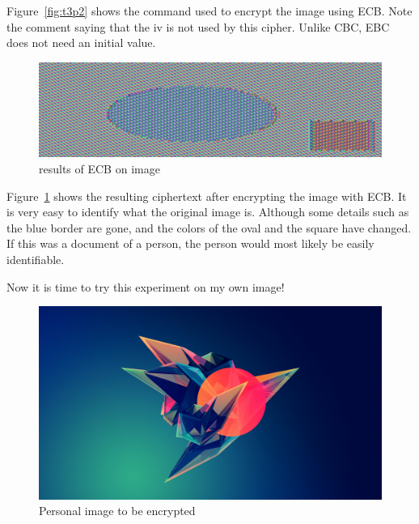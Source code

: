 \documentclass[12pt]{article}
\begin{document}
Figure~\ref{fig:t3p2} shows the command used to encrypt the image using ECB. Note the comment
saying that the iv is not used by this cipher. Unlike CBC, EBC does not need an initial value. 

\begin{figure}[H]
    \begin{center}
        \includegraphics[scale=0.35]{t3p3.png}
    \end{center}{}
    \caption{results of ECB on image}
    \label{fig:t3p3}
\end{figure}

Figure~\ref{fig:t3p3} shows the resulting ciphertext after encrypting the image with ECB. It is
very easy to identify what the original image is. Although some details such as the blue border
are gone, and the colors of the oval and the square have changed. If this was a document of a
person, the person would most likely be easily identifiable.

Now it is time to try this experiment on my own image!

\begin{figure}[H]
    \begin{center}
        \includegraphics[scale=0.2]{t3_personal_image.jpeg}
    \end{center}{}
    \caption{Personal image to be encrypted}
    \label{fig:t3_personal_image}
\end{figure}
\end{document}
